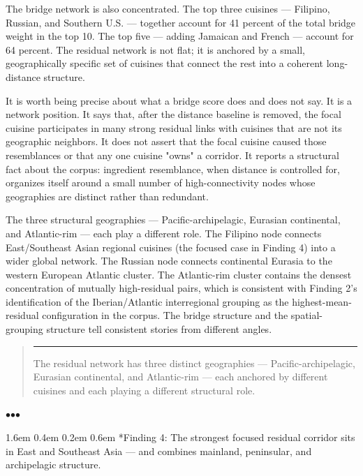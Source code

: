 \documentclass[11pt]{article}
\makeatletter
\renewcommand\section{\@startsection{section}{1}{\z@}%
  {1.6em \@plus 0.4em \@minus 0.2em}%
  {0.6em}%
  {\normalfont\Large\bfseries\color{black!85}}}
\newenvironment{pullquote}
  {\begin{quote}\itshape\color{black!72}\hspace*{-0.4em}\rule{2pt}{1em}\hspace{0.6em}}
  {\end{quote}}
\newcommand{\sectionbreak}{%
  \par\nobreak\vspace{0.8em}%
  \par\centerline{\textcolor{black!40}{$\bullet$\quad$\bullet$\quad$\bullet$}}%
  \par\vspace{0.6em}\nobreak%
}
\makeatother
\begin{document}
The bridge network is also concentrated. The top three cuisines — Filipino, Russian, and Southern U.S. — together account for 41 percent of the total bridge weight in the top 10. The top five — adding Jamaican and French — account for 64 percent. The residual network is not flat; it is anchored by a small, geographically specific set of cuisines that connect the rest into a coherent long-distance structure.


It is worth being precise about what a bridge score does and does not say. It is a network position. It says that, after the distance baseline is removed, the focal cuisine participates in many strong residual links with cuisines that are not its geographic neighbors. It does not assert that the focal cuisine caused those resemblances or that any one cuisine "owns" a corridor. It reports a structural fact about the corpus: ingredient resemblance, when distance is controlled for, organizes itself around a small number of high-connectivity nodes whose geographies are distinct rather than redundant.


The three structural geographies — Pacific-archipelagic, Eurasian continental, and Atlantic-rim — each play a different role. The Filipino node connects East/Southeast Asian regional cuisines (the focused case in Finding 4) into a wider global network. The Russian node connects continental Eurasia to the western European Atlantic cluster. The Atlantic-rim cluster contains the densest concentration of mutually high-residual pairs, which is consistent with Finding 2's identification of the Iberian/Atlantic interregional grouping as the highest-mean-residual configuration in the corpus. The bridge structure and the spatial-grouping structure tell consistent stories from different angles.


\begin{pullquote}
The residual network has three distinct geographies — Pacific-archipelagic, Eurasian continental, and Atlantic-rim — each anchored by different cuisines and each playing a different structural role.
\end{pullquote}


\sectionbreak


\section*{Finding 4: The strongest focused residual corridor sits in East and Southeast Asia — and combines mainland, peninsular, and archipelagic structure.}
\end{document}
